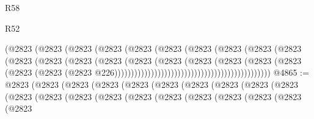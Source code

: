 \begin{lexlean}{R58}
\begin{lexlean}{R52}
\begin{coremodule}
{{{{{{{{{{{{{{{{{{{{{{{{{{{{{{{{{{{{{{{{{{{{{{{{{{{{{{{{{{{{{{{{{{{{{{{{{{{{{{{{{{{{{{{{{{{{{{{{{{{{{{{{{{{{{{{{{{{{{{{{{{{{{{{{{{{{{{{{{{{{{{{{{{{{{{{{{{{{{{{{{{{{{{{{{{{{{{{{{{{{{{{{{{{{{{{{{{{{{{                                                    (@2823
                                                      (@2823
                                                        (@2823
                                                          (@2823
                                                            (@2823
                                                              (@2823
                                                                (@2823
                                                                  (@2823
                                                                    (@2823
                                                                      (@2823
                                                                        (@2823
                                                                          (@2823
                                                                            (@2823
                                                                              (@2823
                                                                                (@2823
                                                                                  (@2823
                                                                                    (@2823
                                                                                      (@2823
                                                                                        (@2823
                                                                                          (@2823
                                                                                            (@2823
                                                                                              (@2823
                                                                                                (@2823
                                                                                                  @226)))))))))))))))))))))))))))))))))))))))))))))))
@4865 := @2823
    (@2823
      (@2823
        (@2823
          (@2823
            (@2823
              (@2823
                (@2823
                  (@2823
                    (@2823
                      (@2823
                        (@2823
                          (@2823
                            (@2823
                              (@2823
                                (@2823
                                  (@2823
                                    (@2823
                                      (@2823
                                        (@2823
                                          (@2823
}}}}}}}}}}}}}}}}}}}}}}}}}}}}}}}}}}}}}}}}}}}}}}}}}}}}}}}}}}}}}}}}}}}}}}}}}}}}}}}}}}}}}}}}}}}}}}}}}}}}}}}}}}}}}}}}}}}}}}}}}}}}}}}}}}}}}}}}}}}}}}}}}}}}}}}}}}}}}}}}}}}}}}}}}}}}}}}}}}}}}}}}}}}}}}}}}}}}}}
\end{coremodule}
\end{lexlean}
\end{lexlean}
